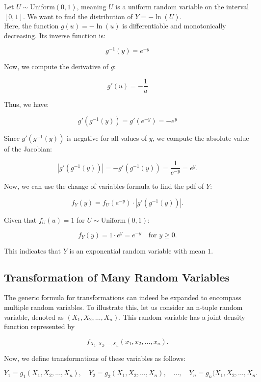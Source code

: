\begin{example}
Let \( U \sim \text{Uniform}(0, 1) \), meaning \( U \) is a uniform random variable on the interval \([0, 1]\). We want to find the distribution of \( Y = -\ln(U) \).\\

Here, the function \( g(u) = -\ln(u) \) is differentiable and monotonically decreasing. Its inverse function is:

\[
g^{-1}(y) = e^{-y}
\]

Now, we compute the derivative of \( g \):

\[
g'(u) = -\frac{1}{u}
\]

Thus, we have:

\[
g'(g^{-1}(y)) = g'(e^{-y}) = -e^y
\]

Since \( g'(g^{-1}(y)) \) is negative for all values of \( y \), we compute the absolute value of the Jacobian:

\[
\left| g'(g^{-1}(y)) \right| = -g'(g^{-1}(y)) = \frac{1}{e^{-y}} = e^y.
\]

Now, we can use the change of variables formula to find the pdf of \( Y \):

\[
f_Y(y) = f_U(e^{-y}) \cdot |g'(g^{-1}(y))|.
\]

Given that \( f_U(u) = 1 \) for \( U \sim \text{Uniform}(0, 1) \):

\[
f_Y(y) = 1 \cdot e^y = e^{-y} \quad \text{for } y \geq 0.
\]

This indicates that \( Y \) is an exponential random variable with mean \( 1 \).
\end{example}

\subsection{Transformation of Many Random Variables}

The generic formula for transformations can indeed be expanded to encompass multiple random variables. To illustrate this, let us consider an n-tuple random variable, denoted as \((X_1, X_2, \ldots, X_n)\). This random variable has a joint density function represented by 

\[
f_{X_1, X_2, \ldots, X_n}(x_1, x_2, \ldots, x_n).
\]

Now, we define transformations of these variables as follows:

\[
Y_1 = g_1(X_1, X_2, \ldots, X_n), \quad Y_2 = g_2(X_1, X_2, \ldots, X_n), \quad \ldots, \quad Y_n = g_n(X_1, X_2, \ldots, X_n.
\]

